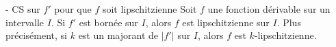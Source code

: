 


\begin{theoreme}{18.30}{- CS sur $f'$ pour que $f$ soit lipschitzienne}
    Soit $f$ une fonction dérivable sur un intervalle $I$. Si $f'$ est bornée sur $I$, alors $f$ est lipschitzienne sur $I$. Plus précisément, si $k$ est un majorant de $|f'|$ sur $I$, alors $f$ est $k$-lipschitzienne.
\end{theoreme}

